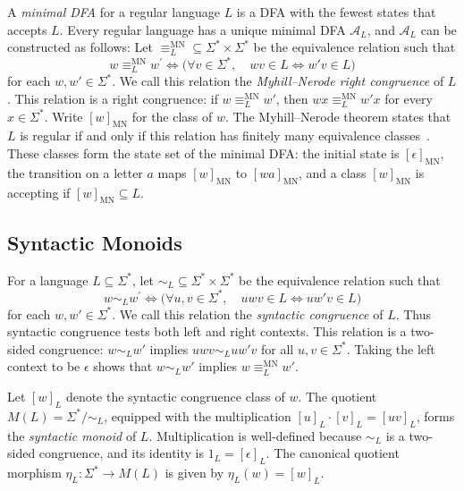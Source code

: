 \documentclass{ieice-tecrep}
\begin{document}
A \emph{minimal DFA} for a regular language \(L\) is a DFA with the fewest states that accepts \(L\).
Every regular language has a unique minimal DFA \(\mathcal{A}_L\), and \(\mathcal{A}_L\) can be constructed as follows:
Let \(\equiv_L^{\mathrm{MN}} \subseteq \Sigma^* \times \Sigma^*\) be the equivalence relation such that
\[
w\equiv_L^{\mathrm{MN}}w^{\prime}
\Longleftrightarrow
\bigl(\forall v\in\Sigma^*,\quad wv\in L\Longleftrightarrow w'v\in L\bigr)
\] for each \(w,w'\in\Sigma^*\).
We call this relation the \emph{Myhill--Nerode right congruence} of \(L\).
This relation is a right congruence: if
\(w\equiv_L^{\mathrm{MN}}w'\), then
\(wx\equiv_L^{\mathrm{MN}}w'x\) for every \(x\in\Sigma^*\).
Write \([w]_{\mathrm{MN}}\) for the class of \(w\).
The Myhill--Nerode theorem states that \(L\) is regular if and only if
this relation has finitely many equivalence classes~\cite{myhill1957finite,nerode1958linear}. These classes
form the state set of the minimal DFA: the initial state is
\([\epsilon]_{\mathrm{MN}}\), the transition on a letter \(a\) maps
\([w]_{\mathrm{MN}}\) to \([wa]_{\mathrm{MN}}\), and a class \([w]_{\mathrm{MN}}\) is
accepting if \([w]_{\mathrm{MN}}\subseteq L\).

\subsection{Syntactic Monoids}\label{syntactic-monoid}

For a language \(L\subseteq\Sigma^*\), let \(\sim_L \subseteq \Sigma^* \times \Sigma^*\) be the equivalence relation such that
\[
w\sim_L w^{\prime}
\Longleftrightarrow
\bigl(\forall u,v\in\Sigma^*,\quad uwv\in L\Longleftrightarrow uw'v\in L\bigr)
\] for each \(w,w'\in\Sigma^*\).
We call this relation the \emph{syntactic congruence} of \(L\).
Thus syntactic congruence tests both left and right contexts.
This relation is a two-sided congruence: \(w\sim_L w'\) implies
\(uwv\sim_L uw'v\) for all \(u,v\in\Sigma^*\).
Taking the left context to be \(\epsilon\) shows that
\(w\sim_L w'\) implies \(w\equiv_L^{\mathrm{MN}}w'\).

Let \([w]_L\) denote the syntactic congruence class of \(w\).
The quotient \(M(L)=\Sigma^*/{\sim_L}\), equipped with the
multiplication \([u]_L\cdot[v]_L=[uv]_L\), forms the \emph{syntactic monoid}
of \(L\). Multiplication is well-defined because \(\sim_L\) is a
two-sided congruence, and its identity is
\(1_L=[\epsilon]_L\). The canonical quotient morphism
\(\eta_L:\Sigma^*\to M(L)\) is given by \(\eta_L(w)=[w]_L\).
\end{document}
